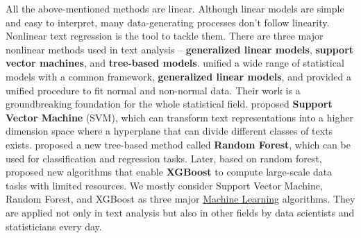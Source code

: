 \documentclass[aoas]{imsart}
\numberwithin{equation}{section}
\theoremstyle{plain}
\theoremstyle{remark}
\begin{document}
All the above-mentioned methods are linear. Although linear models are simple and easy to interpret, many data-generating processes don't follow linearity. Nonlinear text regression is the tool to tackle them. There are three major nonlinear methods used in text analysis – \textbf{generalized linear models}, \textbf{support vector machines}, and \textbf{tree-based models}. \cite{68aee965-a8a0-3e72-9f89-8d89ae91a62b} unified a wide range of statistical models with a common framework, \textbf{generalized linear models}, and provided a unified procedure to fit normal and non-normal data. Their work is a groundbreaking foundation for the whole statistical field. \cite{boser1992training} proposed \textbf{Support Vector Machine} (SVM), which can transform text representations into a higher dimension space where a hyperplane that can divide different classes of texts exists. \cite{rf} proposed a new tree-based method called \textbf{Random Forest}, which can be used for classification and regression tasks. Later, based on random forest, \cite{DBLP:journals/corr/ChenG16} proposed new algorithms that enable \textbf{XGBoost} to compute large-scale data tasks with limited resources. We mostly consider Support Vector Machine, Random Forest, and XGBoost as three major \href{https://en.wikipedia.org/wiki/Machine_learning}{Machine Learning} algorithms. They are applied not only in text analysis but also in other fields by data scientists and statisticians every day. 
\end{document}
